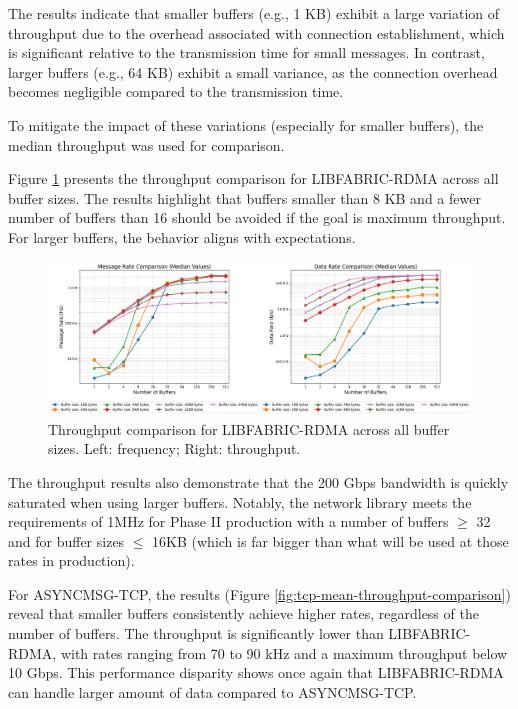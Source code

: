 The results indicate that smaller buffers (e.g., 1 KB) exhibit a large variation of throughput due to the overhead associated with connection establishment, which is significant relative to the transmission time for small messages. In contrast, larger buffers (e.g., 64 KB) exhibit a small variance, as the connection overhead becomes negligible compared to the transmission time.

To mitigate the impact of these variations (especially for smaller buffers), the median throughput was used for comparison.

Figure \ref{fig:libfabric-mean-throughput-comparison} presents the throughput comparison for LIBFABRIC-RDMA across all buffer sizes. The results highlight that buffers smaller than 8 KB and a fewer number of buffers than 16 should be avoided if the goal is maximum throughput. For larger buffers, the behavior aligns with expectations. 

\begin{figure}[htbp]
\centering
\includegraphics[width=\textwidth]{images/results/libfabric_performance_comparison.png}
\caption[Throughput comparison for LIBFABRIC-RDMA across all buffer sizes]{Throughput comparison for LIBFABRIC-RDMA across all buffer sizes. Left: frequency; Right: throughput.}
\label{fig:libfabric-mean-throughput-comparison}
\end{figure}

The throughput results also demonstrate that the 200 Gbps bandwidth is quickly saturated when using larger buffers. Notably, the network library meets the requirements of 1MHz for Phase II production with a number of buffers $\geq$ 32 and for buffer sizes $\leq$ 16KB (which is far bigger than what will be used at those rates in production).

For ASYNCMSG-TCP, the results (Figure \ref{fig:tcp-mean-throughput-comparison}) reveal that smaller buffers consistently achieve higher rates, regardless of the number of buffers. The throughput is significantly lower than LIBFABRIC-RDMA, with rates ranging from 70 to 90 kHz and a maximum throughput below 10 Gbps. This performance disparity shows once again that LIBFABRIC-RDMA can handle larger amount of data compared to ASYNCMSG-TCP.

